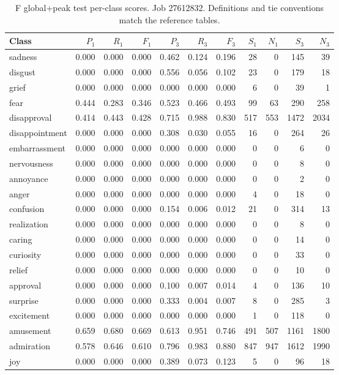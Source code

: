 \begin{table}[!htbp]
\centering
\scriptsize
\setlength{\tabcolsep}{5pt}
\begin{tabular}{lrrrrrrrrrr}
\toprule
Class & $P_1$ & $R_1$ & $F_1$ & $P_3$ & $R_3$ & $F_3$ & $S_1$ & $N_1$ & $S_3$ & $N_3$ \\
\midrule
sadness & 0.000 & 0.000 & 0.000 & 0.462 & 0.124 & 0.196 & 28 & 0 & 145 & 39 \\
disgust & 0.000 & 0.000 & 0.000 & 0.556 & 0.056 & 0.102 & 23 & 0 & 179 & 18 \\
grief & 0.000 & 0.000 & 0.000 & 0.000 & 0.000 & 0.000 & 6 & 0 & 39 & 1 \\
fear & 0.444 & 0.283 & 0.346 & 0.523 & 0.466 & 0.493 & 99 & 63 & 290 & 258 \\
disapproval & 0.414 & 0.443 & 0.428 & 0.715 & 0.988 & 0.830 & 517 & 553 & 1472 & 2034 \\
disappointment & 0.000 & 0.000 & 0.000 & 0.308 & 0.030 & 0.055 & 16 & 0 & 264 & 26 \\
embarrassment & 0.000 & 0.000 & 0.000 & 0.000 & 0.000 & 0.000 & 0 & 0 & 6 & 0 \\
nervousness & 0.000 & 0.000 & 0.000 & 0.000 & 0.000 & 0.000 & 0 & 0 & 8 & 0 \\
annoyance & 0.000 & 0.000 & 0.000 & 0.000 & 0.000 & 0.000 & 0 & 0 & 2 & 0 \\
anger & 0.000 & 0.000 & 0.000 & 0.000 & 0.000 & 0.000 & 4 & 0 & 18 & 0 \\
confusion & 0.000 & 0.000 & 0.000 & 0.154 & 0.006 & 0.012 & 21 & 0 & 314 & 13 \\
realization & 0.000 & 0.000 & 0.000 & 0.000 & 0.000 & 0.000 & 0 & 0 & 8 & 0 \\
caring & 0.000 & 0.000 & 0.000 & 0.000 & 0.000 & 0.000 & 0 & 0 & 14 & 0 \\
curiosity & 0.000 & 0.000 & 0.000 & 0.000 & 0.000 & 0.000 & 0 & 0 & 33 & 0 \\
relief & 0.000 & 0.000 & 0.000 & 0.000 & 0.000 & 0.000 & 0 & 0 & 10 & 0 \\
approval & 0.000 & 0.000 & 0.000 & 0.100 & 0.007 & 0.014 & 4 & 0 & 136 & 10 \\
surprise & 0.000 & 0.000 & 0.000 & 0.333 & 0.004 & 0.007 & 8 & 0 & 285 & 3 \\
excitement & 0.000 & 0.000 & 0.000 & 0.000 & 0.000 & 0.000 & 1 & 0 & 118 & 0 \\
amusement & 0.659 & 0.680 & 0.669 & 0.613 & 0.951 & 0.746 & 491 & 507 & 1161 & 1800 \\
admiration & 0.578 & 0.646 & 0.610 & 0.796 & 0.983 & 0.880 & 847 & 947 & 1612 & 1990 \\
joy & 0.000 & 0.000 & 0.000 & 0.389 & 0.073 & 0.123 & 5 & 0 & 96 & 18 \\
\bottomrule
\end{tabular}
\caption{F global+peak test per-class scores. Job 27612832. Definitions and tie conventions match the reference tables.}
\label{tab:classes-f_global_peak}
\end{table}

